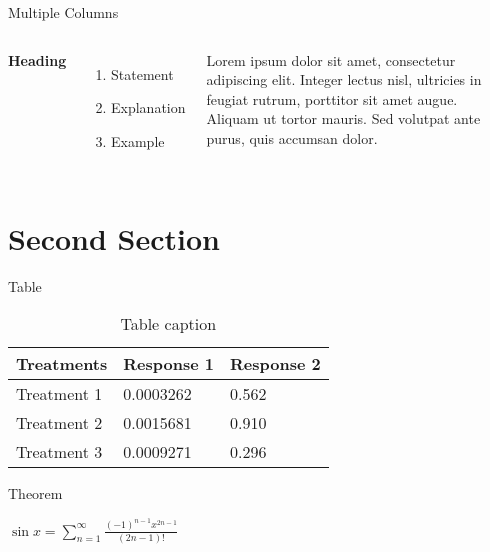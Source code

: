 \documentclass[aspectratio=169,xcolor=dvipsnames,12pt]{beamer}
\begin{document}
\begin{frame}{Multiple Columns}
    \begin{columns}[c]
        \textbf{Heading}
        \begin{enumerate}
            \item Statement
            \item Explanation
            \item Example
        \end{enumerate}

        Lorem ipsum dolor sit amet, consectetur adipiscing elit. Integer lectus nisl, ultricies in feugiat rutrum, porttitor sit amet augue. Aliquam ut tortor mauris. Sed volutpat ante purus, quis accumsan dolor.
    \end{columns}
\end{frame}

\section{Second Section}

\begin{frame}{Table}
    \begin{table}
        \begin{tabular}{l l l}
            \toprule
            \textbf{Treatments} & \textbf{Response 1} & \textbf{Response 2} \\
            \midrule
            Treatment 1         & 0.0003262           & 0.562               \\
            Treatment 2         & 0.0015681           & 0.910               \\
            Treatment 3         & 0.0009271           & 0.296               \\
            \bottomrule
        \end{tabular}
        \caption{Table caption}
    \end{table}
\end{frame}

\begin{frame}{Theorem}
    \begin{theorem}
        $\sin x = \sum\limits_{n = 1}^\infty  {\frac{{\left( { - 1} \right)^{n - 1} x^{2n - 1} }}{{\left( {2n - 1} \right)!}}}$
    \end{theorem}
\end{frame}

\end{document}
